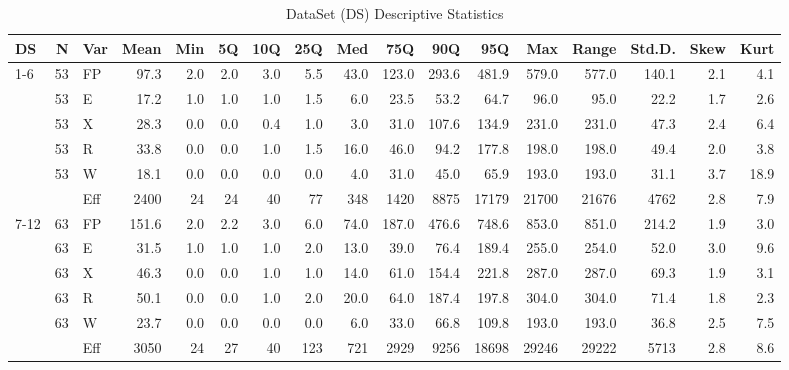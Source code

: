 \documentclass[conference]{IEEEtran}
\begin{document}
\begin{table}
\centering
\caption{DataSet (DS) Descriptive Statistics}
\label{DSDSC}
\begin{tabular}{|l|r|l|r|r|r|r|r|r|r|r|r|r|r|r|r|r|}\hline

\textbf{DS}    & \textbf{N}   & \textbf{Var}       & \textbf{Mean}    & \textbf{Min}    & \textbf{5Q}     & \textbf{10Q}     & \textbf{25Q}     & \textbf{Med}  & \textbf{75Q}     & \textbf{90Q}      & \textbf{95Q}      & \textbf{Max}      & \textbf{Range}    & \textbf{Std.D.} & \textbf{Skew} & \textbf{Kurt} \\\hline
\multirow{6}{*}{1-6}
     & 53 & FP  & 97.3    & 2.0  & 2.0  & 3.0  & 5.5   & 43.0   & 123.0   & 293.6   & 481.9    & 579.0    & 577.0    & 140.1   & 2.1  & 4.1  \\
     & 53 & E   & 17.2    & 1.0  & 1.0  & 1.0  & 1.5   & 6.0    & 23.5    & 53.2    & 64.7     & 96.0     & 95.0     & 22.2    & 1.7  & 2.6  \\
     & 53 & X   & 28.3    & 0.0    & 0.0    & 0.4  & 1.0   & 3.0    & 31.0    & 107.6   & 134.9    & 231.0    & 231.0    & 47.3    & 2.4  & 6.4  \\
     & 53 & R   & 33.8    & 0.0    & 0.0    & 1.0  & 1.5   & 16.0   & 46.0    & 94.2    & 177.8    & 198.0    & 198.0    & 49.4    & 2.0  & 3.8  \\
     & 53 & W   & 18.1    & 0.0    & 0.0    & 0.0    & 0.0     & 4.0    & 31.0    & 45.0    & 65.9     & 193.0    & 193.0    & 31.1    & 3.7  & 18.9 \\
     &    & Eff & 2400 & 24 & 24 & 40 & 77  & 348  & 1420 & 8875 & 17179 & 21700 & 21676 & 4762 & 2.8  & 7.9  \\\hline 
\multirow{6}{*}{7-12} 
     & 63 & FP  & 151.6   & 2.0  & 2.2  & 3.0  & 6.0   & 74.0   & 187.0   & 476.6   & 748.6    & 853.0    & 851.0    & 214.2   & 1.9  & 3.0  \\
     & 63 & E   & 31.5    & 1.0  & 1.0  & 1.0  & 2.0   & 13.0   & 39.0    & 76.4    & 189.4    & 255.0    & 254.0    & 52.0    & 3.0  & 9.6  \\
     & 63 & X   & 46.3    & 0.0    & 0.0    & 1.0  & 1.0   & 14.0   & 61.0    & 154.4   & 221.8    & 287.0    & 287.0    & 69.3    & 1.9  & 3.1  \\
     & 63 & R   & 50.1    & 0.0    & 0.0    & 1.0  & 2.0   & 20.0   & 64.0    & 187.4   & 197.8    & 304.0    & 304.0    & 71.4    & 1.8  & 2.3  \\
     & 63 & W   & 23.7    & 0.0    & 0.0    & 0.0    & 0.0     & 6.0    & 33.0    & 66.8    & 109.8    & 193.0    & 193.0    & 36.8    & 2.5  & 7.5  \\
     &    & Eff & 3050 & 24 & 27 & 40 & 123 & 721  & 2929 & 9256 & 18698 & 29246 & 29222 & 5713 & 2.8  & 8.6\\\hline   
\end{tabular}
\end{table}
\end{document}
